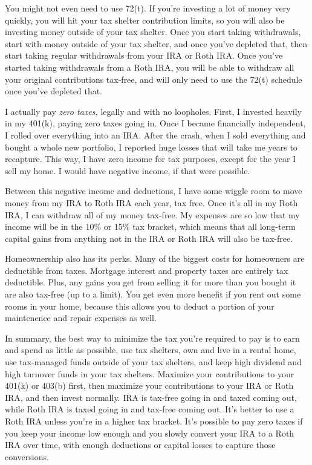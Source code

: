 You might not even need to use 72(t). If you're investing a lot of money very quickly, you will hit your tax shelter contribution limits, so you will also be investing money outside of your tax shelter. Once you start taking withdrawals, start with money outside of your tax shelter, and once you've depleted that, then start taking regular withdrawals from your IRA or Roth IRA. Once you've started taking withdrawals from a Roth IRA, you will be able to withdraw all your original contributions tax-free, and will only need to use the 72(t) schedule once you've depleted that.

I actually pay \emph{zero taxes,} legally and with no loopholes. First, I invested heavily in my 401(k), paying zero taxes going in. Once I became financially independent, I rolled over everything into an IRA. After the crash, when I sold everything and bought a whole new portfolio, I reported huge losses that will take me years to recapture. This way, I have zero income for tax purposes, except for the year I sell my home. I would have negative income, if that were possible.

Between this negative income and deductions, I have some wiggle room to move money from my IRA to Roth IRA each year, tax free. Once it's all in my Roth IRA, I can withdraw all of my money tax-free. My expenses are so low that my income will be in the 10\% or 15\% tax bracket, which means that all long-term capital gains from anything not in the IRA or Roth IRA will also be tax-free.

Homeownership also has its perks. Many of the biggest costs for homeowners are deductible from taxes. Mortgage interest and property taxes are entirely tax deductible. Plus, any gains you get from selling it for more than you bought it are also tax-free (up to a limit). You get even more benefit if you rent out some rooms in your home, because this allows you to deduct a portion of your maintenence and repair expenses as well.

In summary, the best way to minimize the tax you're required to pay is to earn and spend as little as possible, use tax shelters, own and live in a rental home, use tax-managed funds outside of your tax shelters, and keep high dividend and high turnover funds in your tax shelters. Maximize your contributions to your 401(k) or 403(b) first, then maximize your contributions to your IRA or Roth IRA, and then invest normally. IRA is tax-free going in and taxed coming out, while Roth IRA is taxed going in and tax-free coming out. It's better to use a Roth IRA unless you're in a higher tax bracket. It's possible to pay zero taxes if you keep your income low enough and you slowly convert your IRA to a Roth IRA over time, with enough deductions or capital losses to capture those conversions.

